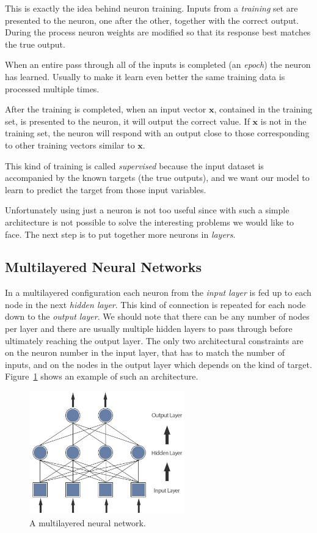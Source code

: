 This is exactly the idea behind neuron training. Inputs from a \emph{training} set are presented to the neuron,  one after the other, together with the correct output. During the process neuron weights are modified so that its response best matches the true output.

When an entire pass through all of the inputs is completed (an \emph{epoch}) the neuron has learned. Usually to make it learn even better the same training data is processed multiple times.

After the training is completed, when an input vector \(\mathbf{x}\), contained in the training set, is presented to the neuron, it will output the correct value. If \(\mathbf{x}\) is not in the training set, the neuron will respond with an output close to those corresponding to other training vectors similar to \(\mathbf{x}\).

This kind of training is called \emph{supervised} because the input dataset is accompanied by the known targets (the true outputs), and we want our model to learn to predict the target from those input variables.

Unfortunately using just a neuron is not too useful since with such a simple architecture is not possible to solve the interesting problems we would like to face. 
The next step is to put together more neurons in \emph{layers}.

\subsection{Multilayered Neural Networks}
\label{multi-layered-neural-networks}

In a multilayered configuration each neuron from the \emph{input layer} is fed up to each node in the next \emph{hidden layer}. This kind of connection is repeated for each node down to the \emph{output layer}. 
We should note that there can be any number of nodes per layer and there are usually multiple hidden layers to pass through before ultimately reaching the output layer. The only two architectural constraints are on the neuron number in the input layer, that has to match the number of inputs, and on the nodes in the output layer which depends on the kind of target. Figure~\ref{fig:multilayered_nn} shows an example of such an architecture.

\begin{figure}[htb]
\centering
\includegraphics[width=0.6\textwidth]{figures/multilayer.jpeg}
\caption{A multilayered neural network.}
\label{fig:multilayered_nn}
\end{figure}

